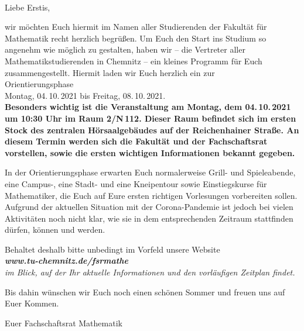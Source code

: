 \documentclass[nkz,einrichtung,usemycontact]{tucletter2019}
\begin{document}
	
\begin{letter}{%
\, \\
}

\opening{Liebe Erstis,}


wir möchten Euch hiermit im Namen aller Studierenden der Fakultät für Mathematik recht herzlich begrüßen.
Um Euch den Start ins Studium so angenehm wie möglich zu gestalten, haben wir -- die Vertreter aller Mathematikstudierenden in Chemnitz -- ein
kleines Programm für Euch zusammengestellt. Hiermit laden wir Euch herzlich ein zur \\[16pt]

\hspace*{\fill} \Large Orientierungsphase \hspace*{\fill} \\
\hspace*{\fill} Montag, 04.\,10.\,2021 bis Freitag, 08.\,10.\,2021. \normalsize \hspace*{\fill} \\[20pt]


\bfseries Besonders wichtig ist die Veranstaltung am Montag, dem 04.\,10.\,2021 um 10:30 Uhr im Raum 2/N\,112. Dieser Raum befindet sich im ersten Stock 
des zentralen Hörsaalgebäudes auf der Reichenhainer Straße. An diesem Termin werden sich die Fakultät und der Fachschaftsrat vorstellen, sowie 
die ersten wichtigen Informationen bekannt gegeben.\mdseries

\smallskip

In der Orientierungsphase erwarten Euch normalerweise Grill- und Spieleabende, eine Campus-, eine Stadt- und eine Kneipentour sowie Einstiegskurse für Mathematiker, die Euch auf Eure ersten richtigen Vorlesungen vorbereiten sollen. Aufgrund der aktuellen Situation mit der Corona-Pandemie ist jedoch bei vielen Aktivitäten noch nicht klar, wie sie in dem entsprechenden Zeitraum stattfinden dürfen, können und werden.

\smallskip

Behaltet deshalb bitte unbedingt im Vorfeld unsere Website \\[8pt]
\hspace*{\fill} \itshape\textbf{www.tu-chemnitz.de/fsrmathe} \upshape \hspace*{\fill} \\[8pt]
im Blick, auf der Ihr aktuelle Informationen und den vorläufigen Zeitplan findet.

\medskip

Bis dahin wünschen wir Euch noch einen schönen Sommer und freuen uns auf Euer Kommen.

\medskip

Euer Fachschaftsrat Mathematik

\end{letter}
\end{document}
